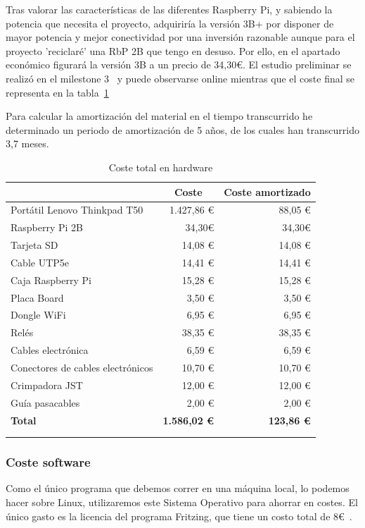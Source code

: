 Tras valorar las características de las diferentes Raspberry Pi, y sabiendo la potencia que necesita el proyecto, adquiriría la versión 3B+ por disponer de mayor potencia y mejor conectividad por una inversión razonable aunque para el proyecto 'reciclaré' una RbP 2B que tengo en desuso. Por ello, en el apartado económico figurará la versión 3B a un precio de 34,30€. El estudio preliminar se realizó en el milestone 3~\cite{misc:Milestone3} y puede observarse online mientras que el coste final se representa en la tabla~\ref{tab:CosteHW}

Para calcular la amortización del material en el tiempo transcurrido he determinado un periodo de amortización de 5 años, de los cuales han transcurrido 3,7 meses.

\begin{longtable}[c]{@{}lrr@{}}
\toprule
\centering
\multicolumn{1}{c}{\textbf{Concepto}} & \multicolumn{1}{c}{\textbf{Coste}} & \multicolumn{1}{c}{\textbf{Coste amortizado}} \\* \midrule
\endfirsthead
%
\endhead
%
\bottomrule
\endfoot
%
\endlastfoot
%
Portátil Lenovo Thinkpad T50 & 1.427,86 € & 88,05 € \\
Raspberry Pi 2B & 34,30€ & 34,30€ \\
Tarjeta SD & 14,08 € & 14,08 € \\
Cable UTP5e & 14,41 € & 14,41 € \\
Caja Raspberry Pi & 15,28 € & 15,28 € \\
Placa Board & 3,50 € & 3,50 € \\
Dongle WiFi & 6,95 € & 6,95 € \\
Relés & 38,35 € & 38,35 € \\
Cables electrónica & 6,59 € & 6,59 € \\
Conectores de cables electrónicos & 10,70 € & 10,70 € \\
Crimpadora JST & 12,00 € & 12,00 € \\
Guía pasacables & 2,00 € & 2,00 € \\ \midrule
\textbf{Total} & \textbf{1.586,02 €} & \textbf{123,86 €} \\ \bottomrule \\
\caption{Coste total en hardware}
\label{tab:CosteHW}
\end{longtable}

\subsubsection{Coste software}
Como el único programa que debemos correr en una máquina local, lo podemos hacer sobre Linux, utilizaremos este Sistema Operativo para ahorrar en costes. El único gasto es la licencia del programa Fritzing, que tiene un costo total de 8€~\cite{misc:Fritzing}.

